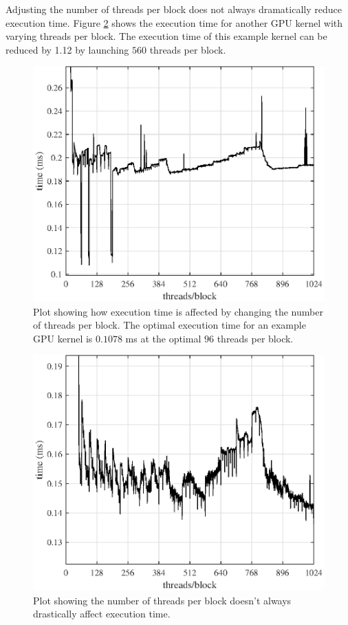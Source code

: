 Adjusting the number of threads per block does not always dramatically reduce execution time.
Figure \ref{fig:ConvGPU_global_12672_186taps} shows the execution time for another GPU kernel with varying threads per block.
The execution time of this example kernel can be reduced by 1.12 by launching $560$ threads per block.
\begin{figure}
	\centering\includegraphics[width=5in]{figures/gpu_intro/ConvGPU_shared_12672_186taps.eps}
	\caption{Plot showing how execution time is affected by changing the number of threads per block.
	The optimal execution time for an example GPU kernel is $0.1078$ ms at the optimal $96$ threads per block.}
	\label{fig:ConvGPU_shared_12672_186taps}
\end{figure}
\begin{figure}
	\centering\includegraphics[width=5in]{figures/gpu_intro/ConvGPU_global_12672_186taps.eps}
	\caption{Plot showing the number of threads per block doesn't always drastically affect execution time.}
	\label{fig:ConvGPU_global_12672_186taps}
\end{figure}

